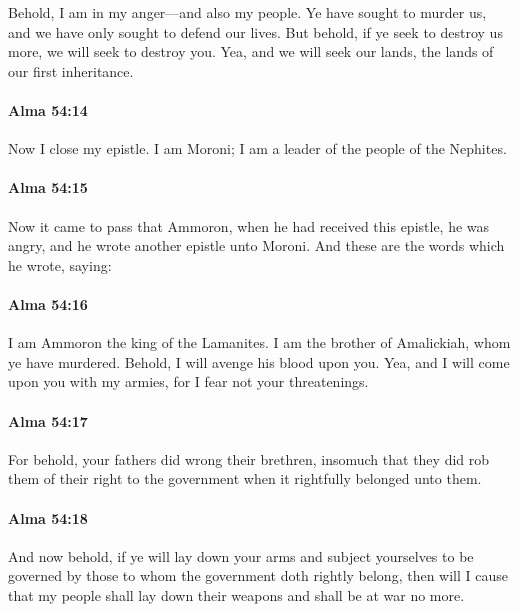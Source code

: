 			Behold, I am in my anger---and also my people.
			Ye have sought to murder us,
			and we have only sought to defend our lives.
			But behold, if ye seek to destroy us more,
			we will seek to destroy you.
			Yea, and we will seek our lands,
			the lands of our first inheritance.

		\paragraph{Alma 54:14} %
			\label{ALMA-54-14}

			Now I close my epistle.
			I am Moroni;
			I am a leader of the people of the Nephites.

		\paragraph{Alma 54:15} %
			\label{ALMA-54-15}

			Now it came to pass that Ammoron, when he had received this epistle,
			he was angry, and he wrote another epistle unto Moroni.
			And these are the words which he wrote, saying:

		\paragraph{Alma 54:16} %
			\label{ALMA-54-16}

			I am Ammoron the king of the Lamanites.
			I am the brother of Amalickiah, whom ye have murdered.
			Behold, I will avenge his blood upon you.
			Yea, and I will come upon you with my armies,
			for I fear not your threatenings.

		\paragraph{Alma 54:17} %
			\label{ALMA-54-17}

			For behold, your fathers did wrong their brethren,
			insomuch that they did rob them of their right to the government
			when it rightfully belonged unto them.

		\paragraph{Alma 54:18} %
			\label{ALMA-54-18}

			And now behold, if ye will lay down your arms
			and subject yourselves to be governed by those
			to whom the government doth rightly belong,
			then will I cause that my people shall lay down their weapons
			and shall be at war no more.


